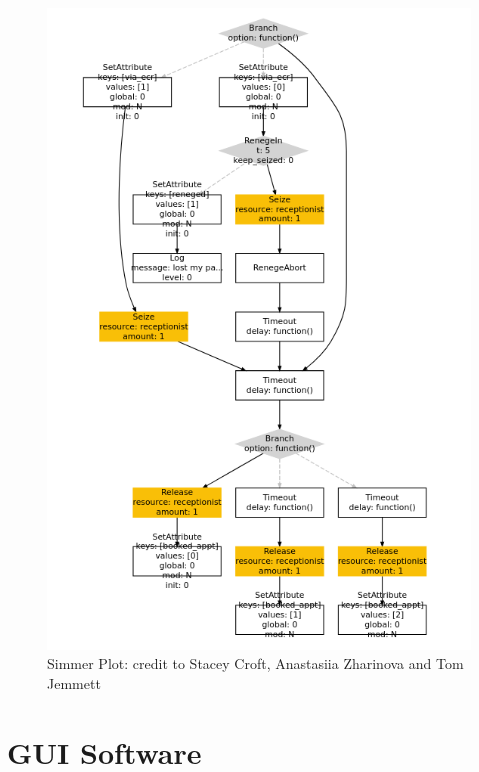 \documentclass[
  letterpaper,
  DIV=11,
  numbers=noendperiod]{scrreprt}
\begin{document}
\begin{figure}[H]

{\centering \includegraphics{images/simmer_plot.png}

}

\caption[Simmer Plot: credit to Stacey Croft, Anastasiia Zharinova and
Tom Jemmett ]{Simmer Plot: credit to Stacey Croft, Anastasiia Zharinova and
Tom Jemmett \footnotemark{}}

\end{figure}%

\section{GUI Software}\label{gui-software}
\end{document}
